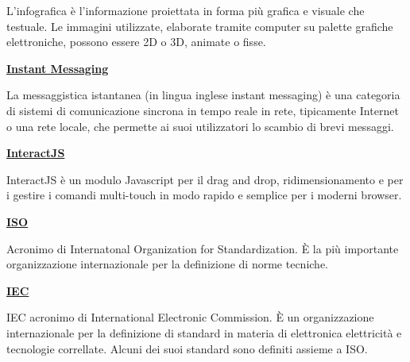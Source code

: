 \medskip
\begin{addmargin}[5em]{1em}		
	L'infografica è l'informazione proiettata in forma più grafica e visuale che testuale. Le immagini utilizzate, elaborate tramite computer su palette grafiche elettroniche, possono essere 2D o 3D, animate o fisse.
\end{addmargin}	

\bigskip
\begin{addmargin}[0em]{0em}		
	\textbf{\underline{Instant Messaging}}
\end{addmargin}

\medskip
\begin{addmargin}[5em]{1em}	
La messaggistica istantanea (in lingua inglese instant messaging) è una categoria di sistemi di comunicazione sincrona in tempo reale in rete, tipicamente Internet o una rete locale, che permette ai suoi utilizzatori lo scambio di brevi messaggi.
\end{addmargin}	

\bigskip
\begin{addmargin}[0em]{0em}		
	\textbf{\underline{InteractJS}}
\end{addmargin}

\medskip
\begin{addmargin}[5em]{1em}	
InteractJS è un modulo Javascript per il drag and drop, ridimensionamento e per i gestire i comandi multi-touch in modo rapido e semplice per i moderni browser.
\end{addmargin}

\bigskip
\begin{addmargin}[0em]{0em}
	\textbf{\underline{ISO}}
\end{addmargin}
	
\medskip
\begin{addmargin}[5em]{1em}	
Acronimo di Internatonal Organization for Standardization. È la più importante organizzazione internazionale per la definizione di norme tecniche. 
\end{addmargin}

\bigskip
\begin{addmargin}[0em]{0em}
	\textbf{\underline{IEC}}
\end{addmargin}
	
\medskip
\begin{addmargin}[5em]{1em}	
IEC acronimo di International Electronic Commission. È un organizzazione internazionale per la definizione di standard in materia di elettronica elettricità e tecnologie correllate. Alcuni dei suoi standard sono definiti assieme a ISO.
\end{addmargin}	

